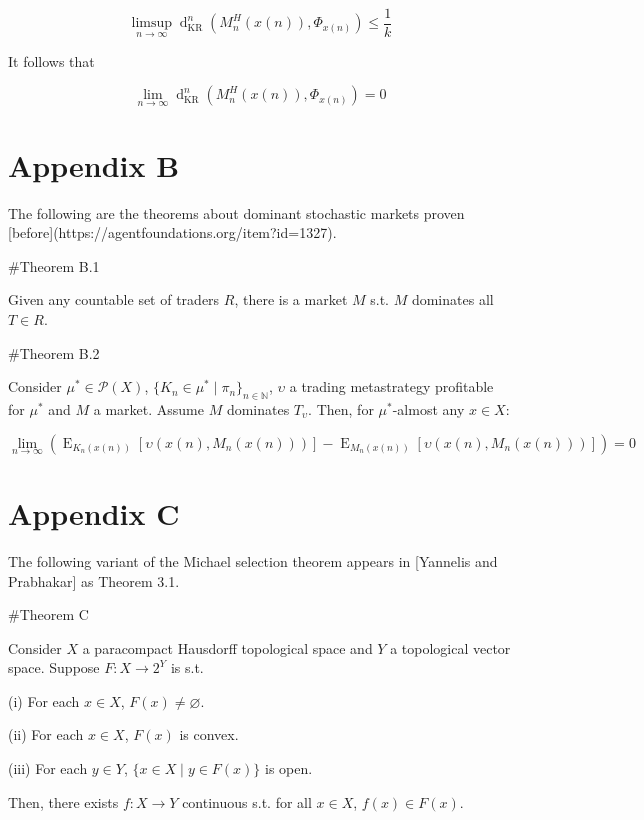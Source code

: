 \documentclass[a4paper]{article}
\newcommand{\Comment}[1]{}
\DeclareMathOperator{\E}{E}
\newcommand{\Nats}{\mathbb{N}}
\newcommand{\Prob}{\mathcal{P}}
\newcommand{\Dkr}{\operatorname{d}_{\text{KR}}}
\begin{document}
$$\limsup_{n \rightarrow \infty} {\Dkr^n(M^H_n(x(n)),\Phi_{x(n)})} \leq \frac{1}{k}$$

It follows that

$$\lim_{n \rightarrow \infty} {\Dkr^n(M^H_n(x(n)),\Phi_{x(n)})} = 0$$

\section{Appendix B}

The following are the theorems about dominant stochastic markets proven [before](https://agentfoundations.org/item?id=1327).

\#Theorem B.1

Given any countable set of traders $R$, there is a market ${M}$ s.t. ${M}$ dominates all ${T \in R}$.

\#Theorem B.2

Consider ${\mu^* \in \Prob(X)}$, ${\{K_n \in \mu^* \mid \pi_{n}\}_{n \in \Nats}}$, ${\upsilon}$ a trading metastrategy profitable for ${\mu^*}$ and ${M}$ a market. Assume ${M}$ dominates ${T_\upsilon}$. Then, for ${\mu^*}$-almost any ${x \in X}$:

$$\lim_{n \rightarrow \infty} (\E_{K_n(x(n))}[\upsilon(x(n),M_n(x(n)))]-\E_{M_n(x(n))}[\upsilon(x(n),M_n(x(n)))])= 0$$

\section{Appendix C}

The following variant of the Michael selection theorem appears in [Yannelis and Prabhakar]\Comment{(https://www.biz.uiowa.edu/faculty/nyannelis/publications/Existence_of_Maximal_Elements_and_Equilibria_in_Linear_Topological_Spaces.pdf)} as Theorem 3.1.

\#Theorem C

Consider $X$ a paracompact Hausdorff topological space and $Y$ a topological vector space. Suppose $F: X \rightarrow 2^Y$ is s.t.

(i) For each $x \in X$, $F(x) \ne \varnothing$.

(ii) For each $x \in X$, $F(x)$ is convex.

(iii) For each $y \in Y$, $\{x \in X \mid y \in F(x)\}$ is open.

Then, there exists $f: X \rightarrow Y$ continuous s.t. for all $x \in X$, $f(x) \in F(x)$.
\end{document}
